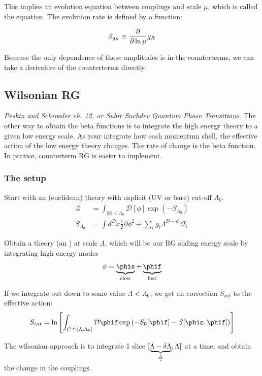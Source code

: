 \documentclass[11pt]{scrartcl}
\begin{document}
This implies an evolution equation between couplings and scale $\mu$, which is called the  equation.  The evolution rate is defined by a  function:

\begin{align}
	\beta_{g_R} \equiv {\partial \over \partial \ln \mu} g_R
	\end{align}

Because the only dependence of those amplitudes is in the counterterms, we can take a derivative of the counterterms directly.

\subsection{Wilsonian RG}
\emph{Peskin and Schroeder ch. 12, or Subir Sachdev Quantum Phase Transitions}.
The other way to obtain the beta functions is to integrate the high energy theory to a given low energy scale.  As your integrate how each momentum shell, the effective action of the low energy theory changes.  The rate of change is the beta function.  In pratice, counterterm RG is easier to implement.
\subsubsection{The setup}
Start with an (euclidean) theory with explicit (UV or bare) cut-off $\Lambda_0$.
\begin{align}
	\mathcal{Z} &= \int_{|k| < \Lambda_0} \mathcal{D}[\phi] \exp\left(- S_{\Lambda_0} \right)  \\
	S_{\Lambda_0} & = \int d^D x \frac12 \partial \phi^2 + \sum_{i} g_i \Lambda^{D-d_i} \mathcal{O}_i
	\end{align}

Obtain a theory (an ) at scale $\Lambda$, which will be our RG sliding energy scale by integrating high energy modes
\begin{align}
	\phi = \underbrace{\phis}_{\text{slow}} + \underbrace{\phif}_{\text{fast}}
	\end{align}

If we integrate out down to some value $\Lambda < \Lambda_0$, we get an correction $S_{int}$ to the effective action:
\begin{align}
	S_{int} = \ln \left[ \int_{C^\infty (\Lambda, \Lambda_0]} \mathcal{D} \phif   \exp\left( -S_0[\phif] -S[\phis, \phif ]\right) \right] 
\end{align}

The wilsonian approach is to integrate 1 slice $[\underbrace{\Lambda - \delta \Lambda}_{\Lambda \over s}, \Lambda]$ at a time, and obtain the change in the couplings.  
\end{document}
